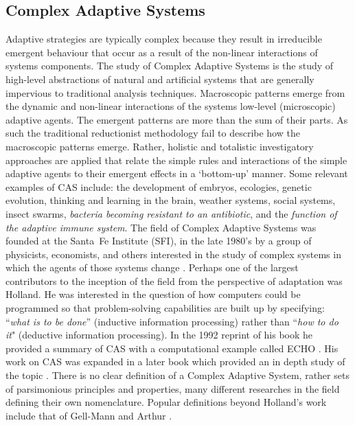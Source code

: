 %
%
\subsection{Complex Adaptive Systems}
\label{subsubsec:cs:adaptive:cas}
Adaptive strategies are typically complex because they result in irreducible emergent behaviour that occur as a result of the non-linear interactions of systems components.
The study of Complex Adaptive Systems is the study of high-level abstractions of natural and artificial systems that are generally impervious to traditional analysis techniques. Macroscopic patterns emerge from the dynamic and non-linear interactions of the systems low-level (microscopic) adaptive agents. The emergent patterns are more than the sum of their parts. As such the traditional reductionist methodology fail to describe how the macroscopic patterns emerge. Rather, holistic and totalistic investigatory approaches are applied that relate the simple rules and interactions of the simple adaptive agents to their emergent effects in a `bottom-up' manner. 
Some relevant examples of CAS include: the development of embryos, ecologies, genetic evolution, thinking and learning in the brain, weather systems, social systems, insect swarms, \emph{bacteria becoming resistant to an antibiotic}, and the \emph{function of the adaptive immune system}. 
The field of Complex Adaptive Systems was founded at the Santa~Fe Institute (SFI), in the late 1980's by a group of physicists, economists, and others interested in the study of complex systems in which the agents of those systems change \cite{Anderson1988}. Perhaps one of the largest contributors to the inception of the field from the perspective of adaptation was Holland. He was interested in the question of how computers could be programmed so that problem-solving capabilities are built up by specifying: ``\emph{what is to be done}'' (inductive information processing) rather than ``\emph{how to do it}" (deductive information processing). In the 1992 reprint of his book he provided a summary of CAS with a computational example called ECHO \cite{Holland1992}. His work on CAS was expanded in a later book which provided an in depth study of the topic \cite{Holland1995}. 
There is no clear definition of a Complex Adaptive System, rather sets of parsimonious principles and properties, many different researches in the field defining their own nomenclature. Popular definitions beyond Holland's work include that of Gell-Mann \cite{Gell-Mann1994} and Arthur \cite{Arthur1997}.


